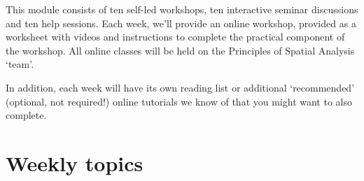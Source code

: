 \documentclass[
]{book}
\begin{document}
This module consists of ten self-led workshops, ten interactive seminar discussions and ten help sessions. Each week, we'll provide an online workshop, provided as a worksheet with videos and instructions to complete the practical component of the workshop. All online classes will be held on the Principles of Spatial Analysis `team'.

In addition, each week will have its own reading list or additional `recommended' (optional, not required!) online tutorials we know of that you might want to also complete.

\hypertarget{weekly-topics}{%
\section*{Weekly topics}\label{weekly-topics}}
\end{document}
